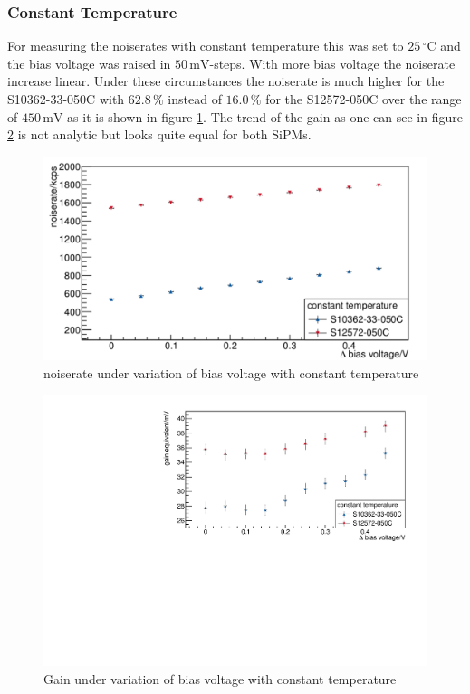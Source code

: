 \subsubsection{Constant Temperature}
For measuring the noiserates with constant temperature this was set to $25\,\mathrm{^{\circ}C}$ and the bias voltage was raised in $50\,\mathrm{mV}$-steps. With more bias voltage the noiserate increase linear. Under these circumstances the noiserate is much higher for the S10362-33-050C with $62.8\,\mathrm{\%}$ instead of $16.0\,\mathrm{\%}$ for the S12572-050C over the range of $450\,\mathrm{mV}$ as it is shown in figure \ref{constTemp_rate}. The trend of the gain as one can see in figure \ref{constTemp_gain} is not analytic but looks quite equal for both SiPMs.
\begin{figure}[h]
	\centering
	\includegraphics[width = 0.75 \textwidth]{Figures/radermacher/ConstTemp_Rate_linear.pdf}
	\caption{noiserate under variation of bias voltage with constant temperature}
	\label{constTemp_rate}
\end{figure}
\begin{figure}[h]
	\centering
	\includegraphics[width = 0.75 \textwidth]{Figures/radermacher/constTemp_Gain.pdf}
	\caption{Gain under variation of bias voltage with constant temperature}
	\label{constTemp_gain}
\end{figure}
